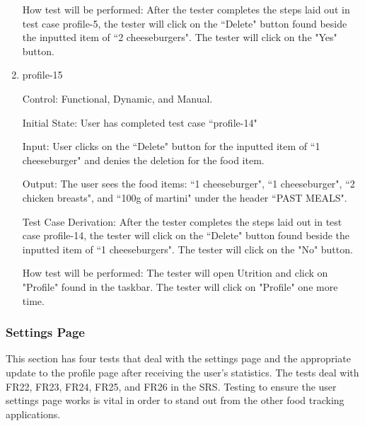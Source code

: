 \documentclass[12pt, titlepage]{article}
\begin{document}
\begin{enumerate}
		How test will be performed: After the tester completes the steps laid out in test case profile-5, the tester will click on the ``Delete" button found beside the inputted item of ``2 cheeseburgers". The tester will click on the "Yes" button.
		
		\item{profile-15\\}
		
		Control: Functional, Dynamic, and Manual.
		
		Initial State: User has completed test case ``profile-14"
		
		Input: User clicks on the ``Delete" button for the inputted item of ``1 cheeseburger" and denies the deletion for the food item.
		
		Output: The user sees the food items: ``1 cheeseburger", ``1 cheeseburger", ``2 chicken breasts", and ``100g of martini" under the header ``PAST MEALS".
		
		Test Case Derivation: After the tester completes the steps laid out in test case profile-14, the tester will click on the ``Delete" button found beside the inputted item of ``1 cheeseburgers". The tester will click on the "No" button.
		
		How test will be performed: The tester will open Utrition and click on "Profile" found in the taskbar. The tester will click on "Profile" one more time.
		
	\end{enumerate}
	
	\subsubsection{Settings Page}
	This section has four tests that deal with the settings page and the appropriate update to the profile page after receiving the user's statistics.  The tests deal with FR22, FR23, FR24, FR25, and FR26 in the SRS. Testing to ensure the user settings page works is vital in order to stand out from the other food tracking applications.
	
\end{document}
